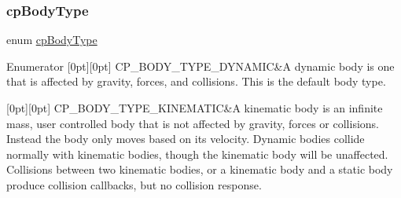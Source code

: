 \subsubsection{\texorpdfstring{cp\+Body\+Type}{cpBodyType}\hspace{0.1cm}{\footnotesize\ttfamily [2/2]}}
{\footnotesize\ttfamily enum \hyperlink{group__cpBody_ga3581b128fd3e2734952aeac8545fd5ca}{cp\+Body\+Type}}

\begin{DoxyEnumFields}{Enumerator}
[0pt][0pt]{}\mbox{\label{group__cpBody_gga3581b128fd3e2734952aeac8545fd5caa443c53c7b27e64799ee0eba728e60db6}} 
C\+P\+\_\+\+B\+O\+D\+Y\+\_\+\+T\+Y\+P\+E\+\_\+\+D\+Y\+N\+A\+M\+IC&A dynamic body is one that is affected by gravity, forces, and collisions. This is the default body type. \\
\hline

[0pt][0pt]{}\mbox{\label{group__cpBody_gga3581b128fd3e2734952aeac8545fd5caa95e6c8d1ff2714d17bc4f2258407e58d}} 
C\+P\+\_\+\+B\+O\+D\+Y\+\_\+\+T\+Y\+P\+E\+\_\+\+K\+I\+N\+E\+M\+A\+T\+IC&A kinematic body is an infinite mass, user controlled body that is not affected by gravity, forces or collisions. Instead the body only moves based on it\textquotesingle{}s velocity. Dynamic bodies collide normally with kinematic bodies, though the kinematic body will be unaffected. Collisions between two kinematic bodies, or a kinematic body and a static body produce collision callbacks, but no collision response. \\
\hline


\end{DoxyEnumFields}
